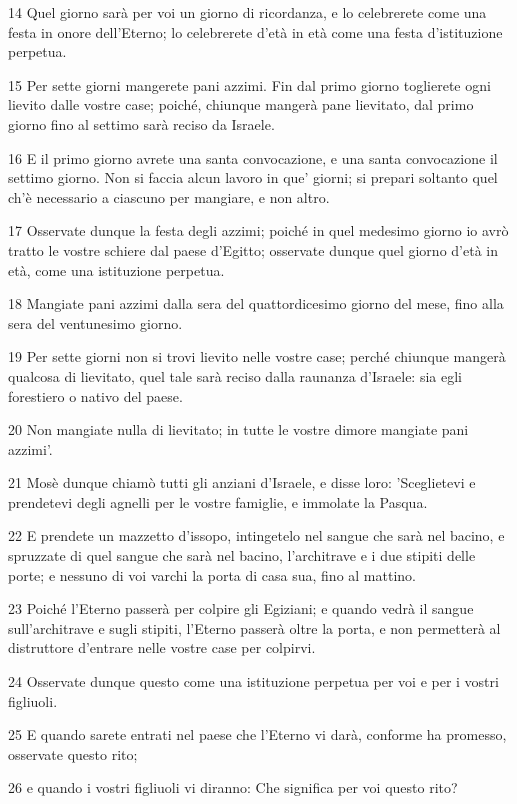 \par 14 Quel giorno sarà per voi un giorno di ricordanza, e lo celebrerete come una festa in onore dell'Eterno; lo celebrerete d'età in età come una festa d'istituzione perpetua.
\par 15 Per sette giorni mangerete pani azzimi. Fin dal primo giorno toglierete ogni lievito dalle vostre case; poiché, chiunque mangerà pane lievitato, dal primo giorno fino al settimo sarà reciso da Israele.
\par 16 E il primo giorno avrete una santa convocazione, e una santa convocazione il settimo giorno. Non si faccia alcun lavoro in que' giorni; si prepari soltanto quel ch'è necessario a ciascuno per mangiare, e non altro.
\par 17 Osservate dunque la festa degli azzimi; poiché in quel medesimo giorno io avrò tratto le vostre schiere dal paese d'Egitto; osservate dunque quel giorno d'età in età, come una istituzione perpetua.
\par 18 Mangiate pani azzimi dalla sera del quattordicesimo giorno del mese, fino alla sera del ventunesimo giorno.
\par 19 Per sette giorni non si trovi lievito nelle vostre case; perché chiunque mangerà qualcosa di lievitato, quel tale sarà reciso dalla raunanza d'Israele: sia egli forestiero o nativo del paese.
\par 20 Non mangiate nulla di lievitato; in tutte le vostre dimore mangiate pani azzimi'.
\par 21 Mosè dunque chiamò tutti gli anziani d'Israele, e disse loro: 'Sceglietevi e prendetevi degli agnelli per le vostre famiglie, e immolate la Pasqua.
\par 22 E prendete un mazzetto d'issopo, intingetelo nel sangue che sarà nel bacino, e spruzzate di quel sangue che sarà nel bacino, l'architrave e i due stipiti delle porte; e nessuno di voi varchi la porta di casa sua, fino al mattino.
\par 23 Poiché l'Eterno passerà per colpire gli Egiziani; e quando vedrà il sangue sull'architrave e sugli stipiti, l'Eterno passerà oltre la porta, e non permetterà al distruttore d'entrare nelle vostre case per colpirvi.
\par 24 Osservate dunque questo come una istituzione perpetua per voi e per i vostri figliuoli.
\par 25 E quando sarete entrati nel paese che l'Eterno vi darà, conforme ha promesso, osservate questo rito;
\par 26 e quando i vostri figliuoli vi diranno: Che significa per voi questo rito?
